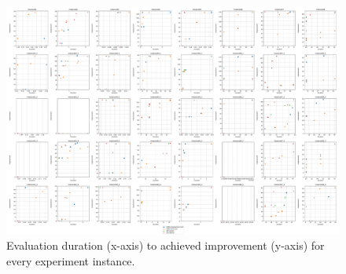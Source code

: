 \begin{figure}[p]
    \centering
    \includegraphics[angle=270,width=\textwidth]{img/exp_duration_improv.pdf}
    \caption{
        Evaluation duration (x-axis) to achieved
        improvement (y-axis) for every experiment instance.
        }
    \label{fig:exp-full/duration-improv}
\end{figure}
